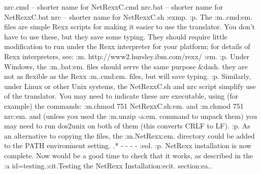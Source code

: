 nrc.cmd      -- shorter name for NetRexxC.cmd
nrc.bat      -- shorter name for NetRexxC.bat
nrc          -- shorter name for NetRexxC.sh
:exmp.
:p.
The :m..cmd:em. files are simple Rexx scripts for making it easier to
use the translator.  You don't have to use these, but they save some
typing.  They should require little modification to run under the Rexx
interpreter for your platform; for details of Rexx interpreters,
see: :m.
http://www2.hursley.ibm.com/rexx/
:em.
:p.
Under Windows, the :m..bat:em. files should serve the same
purpose &dash. they are not as flexible as the Rexx :m..cmd:em. files,
but will save typing.
:p.
Similarly, under Linux or other Unix systems, the NetRexxC.sh and nrc
script simplify use of the translator.  You may need to indicate these
are executable, using (for example) the commands: :m.chmod 751
NetRexxC.sh:em. and :m.chmod 751 nrc:em. and (unless you used
the :m.unzip -a:em. command to unpack them) you may need to run dos2unix
on both of them (this converts CRLF to LF).
:p.
As an alternative to copying the files, the :m.NetRexx\bin:em. directory
could be added to the PATH environment setting.
.* - - - -
:eol.
:p.
NetRexx installation is now complete.  Now would be a good time to check
that it works, as described in the :a id=testing.:cit.Testing the NetRexx
Installation:ecit. section:ea..
